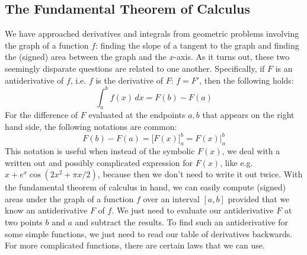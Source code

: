 
%

\subsection{The Fundamental Theorem of Calculus}
We have approached derivatives and integrals from geometric problems involving the graph of a function $f$: finding the slope of a tangent to the graph and finding the (signed) area between the graph and the $x$-axis. As it turns out, these two seemingly disparate questions are related to one another. Specifically, if $F$ is an antiderivative of $f$, i.e. $f$ is the derivative of $F$: $f = F'$, then the following holds:
\begin{equation}
 \int_a^b f(x) \, dx = F(b) - F(a)
\end{equation}
For the difference of $F$ evaluated at the endpoints $a,b$ that appears on the right hand side, the following notations are common:
\begin{equation}
 F(b) - F(a) = \Big[ F(x) \Big]_a^b = F(x) \bigg\rvert_a^b
\end{equation}
This notation is useful when instead of the symbolic $F(x)$, we deal with a written out and possibly complicated expression for $F(x)$, like e.g. $x + e^x \cos(2 x^2 + \pi x /2 )$, because then we don't need to write it out twice. With the fundamental theorem of calculus in hand, we can easily compute (signed) areas under the graph of a function $f$ over an interval $[a,b]$ provided that we know an antiderivative $F$ of $f$. We just need to evaluate our antiderivative $F$ at two points $b$ and $a$ and subtract the results. To find such an antiderivative for some simple functions, we just need to read our table of derivatives backwards. For more complicated functions, there are certain laws that we can use. %




